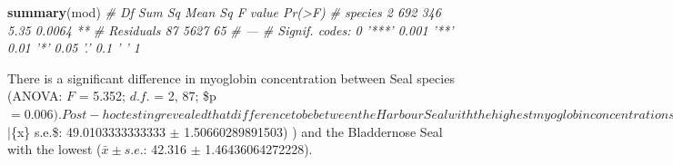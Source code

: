 \documentclass[
]{book}
\newenvironment{Shaded}{\begin{snugshade}}{\end{snugshade}}
\newcommand{\CommentTok}[1]{\textcolor[rgb]{0.56,0.35,0.01}{\textit{#1}}}
\newcommand{\DataTypeTok}[1]{\textcolor[rgb]{0.13,0.29,0.53}{#1}}
\newcommand{\DecValTok}[1]{\textcolor[rgb]{0.00,0.00,0.81}{#1}}
\newcommand{\KeywordTok}[1]{\textcolor[rgb]{0.13,0.29,0.53}{\textbf{#1}}}
\newcommand{\NormalTok}[1]{#1}
\newcommand{\OperatorTok}[1]{\textcolor[rgb]{0.81,0.36,0.00}{\textbf{#1}}}
\newcommand{\StringTok}[1]{\textcolor[rgb]{0.31,0.60,0.02}{#1}}
\begin{document}
\begin{Shaded}
\begin{Highlighting}[]
\KeywordTok{summary}\NormalTok{(mod)}
\CommentTok{#             Df Sum Sq Mean Sq F value Pr(>F)   }
\CommentTok{# species      2    692     346    5.35 0.0064 **}
\CommentTok{# Residuals   87   5627      65                  }
\CommentTok{# ---}
\CommentTok{# Signif. codes:  0 '***' 0.001 '**' 0.01 '*' 0.05 '.' 0.1 ' ' 1}
\end{Highlighting}
\end{Shaded}

\begin{Shaded}
\end{Shaded}

\begin{Shaded}
\end{Shaded}

There is a significant difference in myoglobin concentration between Seal species (ANOVA: \(F\) = 5.352; \(d.f.\) = 2, 87; \$p \(= 0.006). Post-hoc testing revealed that difference to be between the Harbour Seal with the highest myoglobin concentrations (\)\bar\{x\} \pm s.e.\$: 49.0103333333333 \(\pm\) 1.50660289891503) ) and the Bladdernose Seal with the lowest (\(\bar{x} \pm s.e.\): 42.316 \(\pm\) 1.46436064272228).
\end{document}
